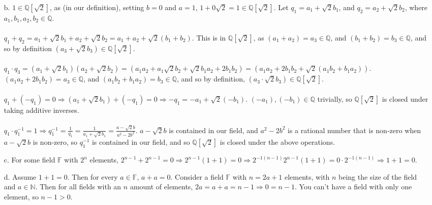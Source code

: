 \documentclass[10pt,english]{article}
\begin{document}
\begin{enumerate}
\begin{enumerate}
    \item [b.] $1\in\mathbb{Q}[\sqrt{2}]$, as (in our definition), setting $b=0$ and $a=1$, $1+0\sqrt{2}=1\in\mathbb{Q}[\sqrt{2}]$. Let $q_1=a_1+\sqrt{2}b_1$, and $q_2=a_2+\sqrt{2}b_2$, where $a_1,b_1,a_2,b_2\in\mathbb{Q}$. \\ \\
$q_1+q_2 = a_1+\sqrt{2}b_1+a_2+\sqrt{2}b_2=a_1+a_2+\sqrt{2}(b_1+b_2)$. This is in $\mathbb{Q}[\sqrt{2}]$, as $(a_1+a_2)=a_3\in\mathbb{Q}$, and $(b_1+b_2)=b_3\in\mathbb{Q}$, and so by definition $(a_3+\sqrt{2}b_3)\in\mathbb{Q}[\sqrt{2}]$. \\ \\
$q_1\cdot q_3 = (a_1+\sqrt{2}b_1)(a_2+\sqrt{2}b_2) = (a_1a_2+a_1\sqrt{2}b_2+\sqrt{2}b_1a_2+2b_1b_2)=(a_1a_2+2b_1b_2+\sqrt{2}(a_1b_2+b_1a_2))$. $(a_1a_2+2b_1b_2)=a_3\in\mathbb{Q}$, and $(a_1b_2+b_1a_2)=b_3\in\mathbb{Q}$, and so by definition, $(a_3\cdot\sqrt{2}b_3)\in\mathbb{Q}[\sqrt{2}]$. \\\\
$q_1+(-q_1)=0\Rightarrow (a_1+\sqrt{2}b_1)+(-q_1)=0\Rightarrow -q_1=-a_1+\sqrt{2}(-b_1)$. $(-a_1),(-b_1)\in\mathbb{Q}$ trivially, so $\mathbb{Q}[\sqrt{2}]$ is closed under taking additive inverses.  \\ \\ 
$q_1\cdot q_1^{-1}=1\Rightarrow q_1^{-1}=\frac{1}{q_1}=\frac{1}{a_1+\sqrt{2}{b_1}}=\frac{a-\sqrt{2}b}{a^2-2b^2}$. $a-\sqrt{2}b$ is contained in our field, and $a^2-2b^2$ is a rational number that is non-zero when $a-\sqrt{2}b$ is non-zero, so $q_1^{-1}$ is contained in our field, and so $\mathbb{Q}[\sqrt{2}]$ is closed under the above operations.  
    \item [c.] For some field $\mathbb{F}$ with $2^n$ elements, $2^{n-1}+2^{n-1}=0\Rightarrow 2^{n-1}(1+1)=0\Rightarrow 2^{-1(n-1)}2^{n-1}(1+1)=0\cdot 2^{-1(n-1)}\Rightarrow 1+1=0$. 
    \item [d.] Assume $1+1=0$. Then for every $a\in\mathbb{F}$, $a+a=0$. Consider a field $\mathbb{F}$ with $n=2a+1$ elements, with $n$ being the size of the field and $a\in\mathbb{N}$. Then for all fields with an $n$ amount of elements, $2a=a+a=n-1\Rightarrow 0=n-1$. You can't have a field with only one element, so $n-1>0$.  

\end{enumerate}


\end{enumerate}
\end{document}
